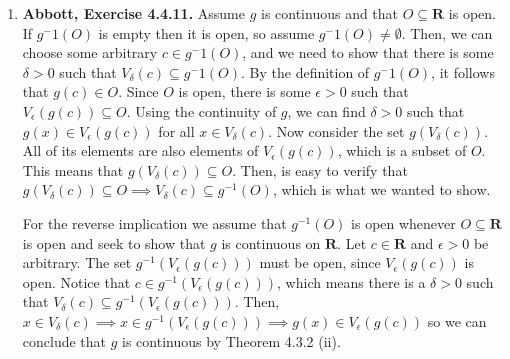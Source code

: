 \documentclass{article}
\makeatletter
\DeclarePairedDelimiter\abs{\lvert}{\rvert}
\let\oldabs\abs
\def\abs{\@ifstar{\oldabs}{\oldabs*}}
\newcommand{\R}{\mathbf{R}}
\newcommand{\exc}[2][Abbott]{\item \textbf{#1, Exercise #2.}}
\newcommand{\lep}[1][L]{#1et $\epsilon > 0$ be arbitrary}
\makeatother
\begin{document}
\begin{enumerate}
\begin{enumerate}
        \item Set $A := \R$ and $f(x)=g(x) = x$. Both $f$ and $g$ are uniformly continuous on $\R$, but $f(x)g(x) = x^2$ is not.  
        
        \item Set $A := (0, 1)$, $f(x) := 1$ and $g(x) := x$. Then, $f(x)/g(x) = 1/x$, which is not uniformly continuous on $A$ by Exercise 4.4.2 (a). 
        
        \item Set $A := (1, \infty)$, $f(x) := 1/x$ and $g(x) := x-1$. It is easy to verify that both $f$ and $g$ are uniformly continuous on $A$. However, $f(g(x)) = 1/(x-1)$ is not bounded at $A$, so it cannot be uniformly continuous, by Exercise 4.4.4 (b).
        
        \item \lep. Choose $\delta_1 > 0$ such that $\abs{f(x)-f(y)} < \epsilon$ when $\abs{x-y} < \delta_1$. Next, choose $\delta > 0$ such that $\abs{g(x)-g(y)} < \delta_1$ whenever $\abs{x-y} < \delta$. Now let $x,y \in A$ be such that $\abs{x-y} < \delta$. It follows that $\abs{g(x)-g(y)} < \delta_1$. This implies $\abs{f(g(x))-f(g(y))} < \epsilon$, so $f \circ g$ is uniformly continuous on $A$.
    \end{enumerate}
    
    \exc{4.4.11}
    Assume $g$ is continuous and that $O \subseteq \R$ is open. If $g^-1(O)$ is empty then it is open, so assume $g^-1(O) \neq \emptyset$. Then, we can choose some arbitrary $c \in g^-1(O)$, and we need to show that there is some $\delta > 0$ such that $V_{\delta}(c) \subseteq g^{-}1(O)$. By the definition of $g^-1(O)$, it follows that $g(c) \in O$. Since $O$ is open, there is some $\epsilon > 0$ such that $V_\epsilon(g(c)) \subseteq O$. Using the continuity of $g$, we can find $\delta > 0$ such that $g(x) \in V_\epsilon(g(c))$ for all $x \in V_\delta(c)$. Now consider the set $g(V_\delta(c))$. All of its elements are also elements of $V_\epsilon(g(c))$, which is a subset of $O$. This means that $g(V_\delta(c)) \subseteq O$. Then, is easy to verify that $g(V_\delta(c)) \subseteq O \implies V_\delta(c) \subseteq g^{-1}(O)$, which is what we wanted to show.
    
    For the reverse implication we assume that $g^{-1}(O)$ is open whenever $O \subseteq \R$ is open and seek to show that $g$ is continuous on $\R$. Let $c \in \R$ and $\epsilon > 0$ be arbitrary. The set $g^{-1}(V_\epsilon(g(c)))$ must be open, since $V_\epsilon(g(c))$ is open. Notice that $c \in g^{-1}(V_\epsilon(g(c)))$, which means there is a $\delta > 0$ such that $V_\delta(c) \subseteq g^{-1}(V_\epsilon(g(c)))$. Then, $x \in V_\delta(c) \implies x \in g^{-1}(V_\epsilon(g(c))) \implies g(x) \in V_\epsilon(g(c))$ so we can conclude that $g$ is continuous by Theorem 4.3.2 (ii).
    

\end{enumerate}
\end{document}
